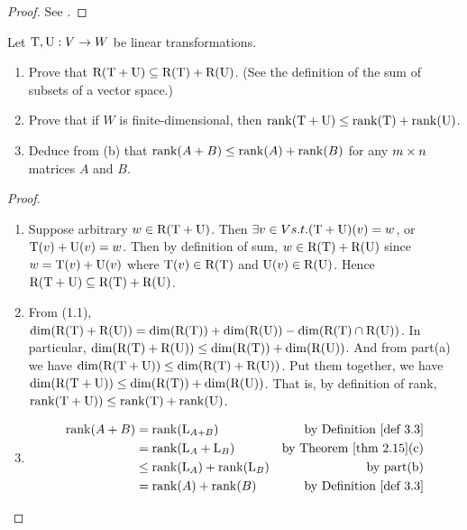 \begin{proof}
See .
\end{proof}

\begin{exercise} \label{exercise 3.2.14}
Let \(\mathrm{T}, \mathrm{U}: V \to W\) be linear transformations.
\begin{enumerate}
\item Prove that \(\mathrm{R}(\mathrm{T} + \mathrm{U}) \subseteq \mathrm{R(T)} + \mathrm{R}(\mathrm{U})\).
(See the definition  of the sum of subsets of a vector space.)
\item Prove that if \(W\) is finite-dimensional, then \(\mathrm{rank}(\mathrm{T} + \mathrm{U}) \le \mathrm{rank}(\mathrm{T}) + \mathrm{rank}(\mathrm{U})\).
\item Deduce from (b) that \(\mathrm{rank}(A + B) \le \mathrm{rank}(A) + \mathrm{rank}(B)\) for any \(m \times n\) matrices \(A\) and \(B\).
\end{enumerate}
\end{exercise}

\begin{proof} \ 

\begin{enumerate}
\item Suppose arbitrary \(w \in \mathrm{R}(\mathrm{T} + \mathrm{U})\).
Then \(\exists v \in V s.t. (\mathrm{T} + \mathrm{U})(v) = w\), or \(\mathrm{T}(v) + \mathrm{U}(v) = w\).
Then by definition of sum, \(w \in \mathrm{R(T)} + \mathrm{R}(\mathrm{U})\) since \(w = \mathrm{T}(v) + \mathrm{U}(v)\) where \(\mathrm{T}(v) \in \mathrm{R(T)}\) and \(\mathrm{U}(v) \in \mathrm{R}(\mathrm{U})\).
Hence \(\mathrm{R}(\mathrm{T} + \mathrm{U}) \subseteq \mathrm{R(T)} + \mathrm{R}(\mathrm{U})\).

\sloppy
\item From (1.1), \(\dim(\mathrm{R(T)} + \mathrm{R}(\mathrm{U})) = \dim(\mathrm{R(T)}) + \dim(\mathrm{R}(\mathrm{U})) - \dim(\mathrm{R(T)} \cap \mathrm{R}(\mathrm{U}))\).
In particular, \(\dim(\mathrm{R(T)} + \mathrm{R}(\mathrm{U})) \le \dim(\mathrm{R(T)}) + \dim(\mathrm{R}(\mathrm{U}))\).
And from part(a) we have \(\dim(\mathrm{R}(\mathrm{T} + \mathrm{U})) \le \dim(\mathrm{R(T)} + \mathrm{R}(\mathrm{U}))\).
Put them together, we have \(\dim(\mathrm{R}(\mathrm{T} + \mathrm{U})) \le \dim(\mathrm{R(T)}) + \dim(\mathrm{R}(\mathrm{U}))\).
That is, by definition of rank, \(\mathrm{rank}(\mathrm{T} + \mathrm{U})) \le \mathrm{rank}(\mathrm{T}) + \mathrm{rank}(\mathrm{U})\).

\item
\begin{align*}
    \rank(A + B) & = \rank(\LMTRAN_{A + B}) & \text{by \DEF{3.3}} \\
                 & = \rank(\LMTRAN_A + \LMTRAN_B) & \text{by \THM{2.15}(c)} \\
                 & \le \rank(\LMTRAN_A) + \rank(\LMTRAN_B) & \text{by part(b)} \\
                 & = \rank(A) + \rank(B) & \text{by \DEF{3.3}}
\end{align*}
\end{enumerate}
\end{proof}

